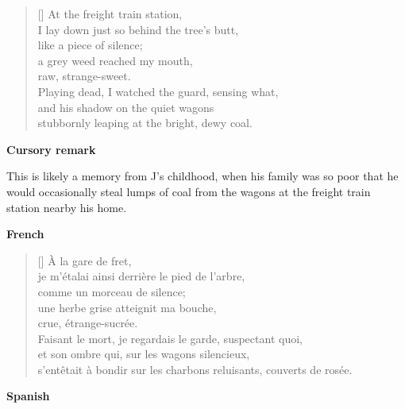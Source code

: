 \documentclass[a4paper,12pt,twoside,final]{book}
\begin{document}

\settowidth{\versewidth}{stubbornly leaping at the bright, dewy coal.}

\begin{verse}[\versewidth]
  At the freight train station, \\
  I lay down just so behind the tree's butt, \\
  like a piece of silence; \\
  a grey weed reached my mouth, \\
  raw, strange-sweet. \\
  Playing dead, I watched the guard, sensing what, \\
  and his shadow on the quiet wagons \\
  stubbornly leaping at the bright, dewy coal. \\
\end{verse}

\bigskip

\noindent \textbf{Cursory remark}

\medskip

This is likely a memory from J's childhood, when his family was so
poor that he would occasionally steal lumps of coal from the wagons at
the freight train station nearby his home.

\bigskip

\noindent \textbf{French}


\settowidth{\versewidth}{s'entêtait à bondir sur les charbons reluisants, couverts de rosée.}

\begin{verse}[\versewidth]
  À la gare de fret, \\
  je m'étalai ainsi derrière le pied de l'arbre, \\
  comme un morceau de silence; \\
  une herbe grise atteignit ma bouche, \\
  crue, étrange-sucrée. \\
  Faisant le mort, je regardais le garde, suspectant quoi, \\
  et son ombre qui, sur les wagons silencieux, \\
  s'entêtait à bondir sur les charbons reluisants, couverts de rosée. \\
\end{verse}

\bigskip

\noindent \textbf{Spanish}
\end{document}
